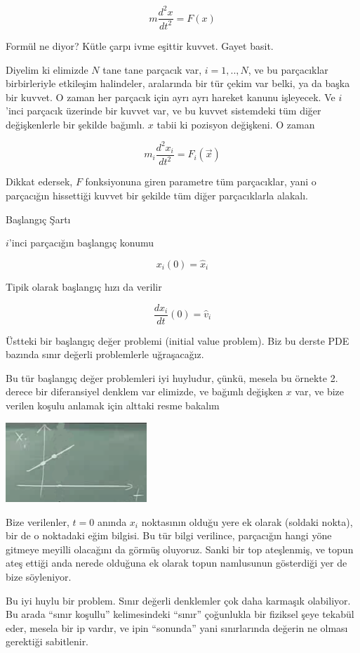 \documentclass[12pt,fleqn]{article}\usepackage{../../common}
\begin{document}
$$ m \frac{d^2x}{dt^2} = F(x) $$

Formül ne diyor? Kütle çarpı ivme eşittir kuvvet. Gayet basit.

Diyelim ki elimizde $N$ tane tane parçacık var, $i=1,..,N$, ve bu
parçacıklar birbirleriyle etkileşim halindeler, aralarında bir tür çekim
var belki, ya da başka bir kuvvet. O zaman her parçacık için ayrı ayrı
hareket kanunu işleyecek. Ve $i$'inci parçacık üzerinde bir kuvvet var, ve
bu kuvvet sistemdeki tüm diğer değişkenlerle bir şekilde bağımlı. $x$ tabii
ki pozisyon değişkeni. O zaman

$$ m_i \frac{d^2x_i}{dt^2} = F_i(\vec{x}) $$

Dikkat edersek, $F$ fonksiyonuna giren parametre tüm parçacıklar, yani o
parçacığın hissettiği kuvvet bir şekilde tüm diğer parçacıklarla alakalı. 

Başlangıç Şartı

$i$'inci parçacığın başlangıç konumu

$$ x_i(0) = \hat{x}_i $$

Tipik olarak başlangıç hızı da verilir

$$ \frac{dx_i}{dt}(0) = \hat{v}_i $$

Üstteki bir başlangıç değer problemi (initial value problem). Biz bu derste
PDE bazında sınır değerli problemlerle uğraşacağız. 

Bu tür başlangıç değer problemleri iyi huyludur, çünkü, mesela bu örnekte
2. derece bir diferansiyel denklem var elimizde, ve bağımlı değişken $x$
var, ve bize verilen koşulu anlamak için alttaki resme bakalım

\includegraphics[height=3cm]{1_06.png}

Bize verilenler, $t=0$ anında $x_i$ noktasının olduğu yere ek olarak
(soldaki nokta), bir de o noktadaki eğim bilgisi. Bu tür bilgi verilince,
parçacığın hangi yöne gitmeye meyilli olacağını da görmüş oluyoruz. Sanki
bir top ateşlenmiş, ve topun ateş ettiği anda nerede olduğuna ek olarak
topun namlusunun gösterdiği yer de bize söyleniyor.

Bu iyi huylu bir problem. Sınır değerli denklemler çok daha karmaşık
olabiliyor. Bu arada ``sınır koşullu'' kelimesindeki ``sınır'' çoğunlukla
bir fiziksel şeye tekabül eder, mesela bir ip vardır, ve ipin ``sonunda''
yani sınırlarında değerin ne olması gerektiği sabitlenir. 
\end{document}
